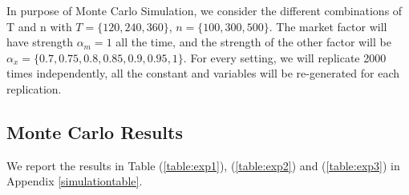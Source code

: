 
In purpose of Monte Carlo Simulation, we consider the different combinations of T and n with $T = \{120, 240, 360\}$, $n =\{100, 300, 500\} $.
The market factor will have strength $\alpha_m = 1$ all the time, and the strength of the other factor will be $\alpha_{x} = \{0.7, 0.75, 0.8,0.85, 0.9,0.95, 1\}$. For every setting, we will replicate 2000 times independently, all the constant and variables will be re-generated for each replication.


 
\subsection{Monte Carlo Results}
We report the results in Table (\ref{table:exp1}), (\ref{table:exp2}) and (\ref{table:exp3}) in Appendix \ref{simulationtable}.

